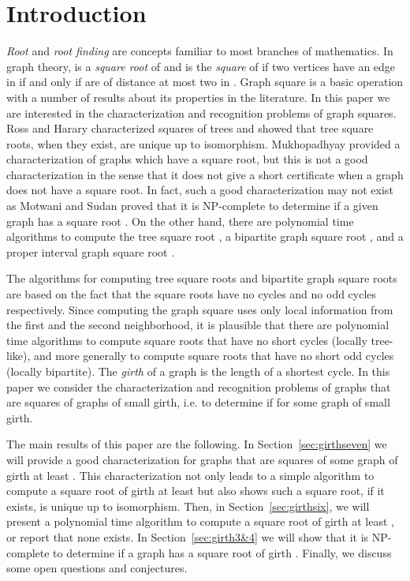 \documentclass[proceedings]{stacs}
\newlength{\ai}
\begin{document}
\maketitle

\section{Introduction}


{\em Root} and {\em root finding} are concepts familiar to most
branches of mathematics.
In graph theory,  is a {\em square root} of 
and  is the {\em square} of  if
two vertices  have an edge in  if and only if
 are of distance at most two in .
Graph square is a basic operation
with a number of results about its properties in the literature. In this paper we are interested in the characterization
and recognition problems of graph squares.
Ross and Harary \cite{RosHar1960} characterized squares of trees and showed
that tree square roots, when they exist, are unique up to isomorphism.
Mukhopadhyay \cite{Muk1967} provided a characterization of graphs which have a
square root, but this is not a good characterization in the sense
that it does not give a short certificate
when a graph does not have a square root.
In fact, such a good characterization may not exist
as Motwani and Sudan proved that it is NP-complete
to determine if a given graph has a square root \cite{MotSud1994}.
On the other hand, there are polynomial time algorithms
to compute the tree square root
\cite{LinSki1995,KeaCor1998,Lau2006,BraLeSri2006,ChaKoLu2006},
a bipartite graph square root \cite{Lau2006},
and a proper interval graph square root \cite{LauCor2004}.

The algorithms for computing tree square roots
and bipartite graph square roots are based on the fact that
the square roots have no cycles and no odd cycles respectively.
Since computing the graph square uses only local information
from the first and the second neighborhood,
it is plausible that there are polynomial time algorithms
to compute square roots that have no short cycles
(locally tree-like), and more generally to compute square roots that
have no short odd cycles (locally bipartite).
The {\em girth} of a graph is the length of a shortest cycle.
In this paper we consider the characterization and recognition
problems of graphs that are squares of graphs of small girth,
i.e. to determine if  for some graph  of small girth.

The main results of this paper are the following.
In Section~\ref{sec:girthseven} we will provide a good characterization
for graphs that are squares of some graph of girth at least .
This characterization not only leads to a simple algorithm to compute
a square root of girth at least  but also shows such a square root, if it exists, is unique
up to isomorphism.
Then, in Section~\ref{sec:girthsix}, we will present a polynomial time
algorithm to compute a square root of girth at least , or report that none exists.
In Section~\ref{sec:girth3&4} we will show that it is NP-complete to determine if a graph  has
a square root of girth .
Finally, we discuss some open questions and conjectures.
\end{document}
